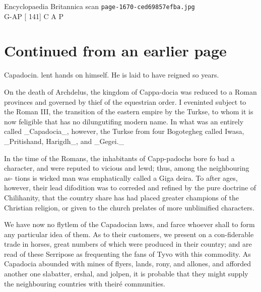 \documentclass{article}
\begin{document}
\begin{center}
{\Large Encyclopaedia Britannica scan \texttt{page-1670-ced69857efba.jpg}}\\[0.5em]
G-AP [ 141] C A P
\end{center}
\section*{Continued from an earlier page}
Capadocin. lent hands on himself. He is laid to have reigned so years.

On the death of Archdelus, the kingdom of Cappa-docia was reduced to a Roman provinces and governed by thief of the equestrian order. I eveninted subject to the Roman III, the transition of the eastern empire by the Turkse, to whom it is now feligible that has no dilungutifing modern name. In what was an entirely called \_Capadocia\_, however, the Turkse from four Bogotegheg called Iwasa, \_Pritishand, Harigdh\_, and \_Gegei.\_

In the time of the Romans, the inhabitants of Capp-padochs bore fo bad a character, and were reputed to vicious and lewd; thus, among the neighbouring as- tions is wicked man was emphatically called a Giga deira. To after ages, however, their lead difodition was to correded and refined by the pure doctrine of Chilihanity, that the country share has had placed greater champions of the Christian religion, or given to the church prelates of more unblimified characters.

We have now no flytlem of the Capadocian laws, and farce whoever shall to form any particular idea of them. As to their customers, we present on a con-fiderable trade in horses, great numbers of which were produced in their country; and are read of these Serripose as frequenting the fans of Tyvo with this commodity. As Capadocia abounded with mines of flyers, lands, rony, and allones, and afforded another one slabatter, ershal, and jolpen, it is probable that they might supply the neighbouring countries with theiré communities.
\end{document}
